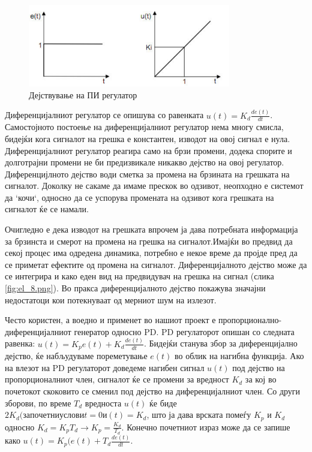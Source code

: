 \documentclass[12pt]{article}
\begin{document}
			\begin{figure}[H]
				\includegraphics[width=0.3\linewidth]{./images/el_5.png}
				\centering
				\caption{Дејствување на ПИ регулатор}
				\label{fig:el_7.png}
				\end{figure}

			Диференцијалниот регулатор се опишува со равенката $u(t) = K_d\frac{de(t)}{dt}$.
			Самостојното постоење на диференцијалниот регулатор нема многу смисла, бидејќи кога сигналот на грешка е константен, изводот на овој сигнал е нула. Диференцијалниот регулатор реагира само на брзи промени, додека спорите и долготрајни промени не би предизвикале никакво дејство на овој регулатор. Диференцијлното дејство води сметка за промена на брзината на грешката на сигналот. Доколку не сакаме да имаме прескок во одзивот, неопходно е системот да ‘кочи‘, односно да се успорува промената на одзивот кога грешката на сигналот ќе се намали.

			Очигледно е дека изводот на грешката впрочем ја дава потребната информација за брзинста и смерот на промена на грешка на сигналот.Имајќи во предвид да секој процес има одредена динамика, потребно е некое време да пројде пред да се приметат ефектите од промена на сигналот. Диференцијалното дејство може да се интегрира и како еден вид на предвидувач на грешка на сигнал (слика \ref{fig:el_8.png}). Во пракса диференцијалното дејство покажува значајни недостатоци кои потекнуваат од мерниот шум на излезот.

			Често користен, а воедно и применет во нашиот проект е пропорционално-диференцијалниот генератор односно PD. PD регулаторот опишан со следната равенка: $u(t)=K_{p}e(t)+K_{d}\frac{de(t)}{dt}$. Бидејќи станува збор за диференцијално дејство, ќе набљудуваме пореметување $e(t)$ во облик на нагибна функција. Ако на влезот на PD регулаторот доведеме нагибен сигнал $u(t)$ под дејство на пропорционалниот член, сигналот ќе се промени за вредност $K_{d}$ за кој во почетокот скоковито се сменил под дејство на диференцијалниот член. Со други зборови, по време $T_{d}$ вредноста $u(t)$ ќе биде $2K_{d} (за почетни услови t=0 и (t)=K_{d}$, што ја дава врската помеѓу $K_{p}$ и $K_{d}$ односно $K_{d}=K_{p}T_{d}\rightarrow K_{p}=\frac{K_{d}}{T_{d}}$. Конечно почетниот израз може да се запише како $u(t)=K_{p}(e(t)+T_{d}\frac{de(t)}{dt}$.
\end{document}
